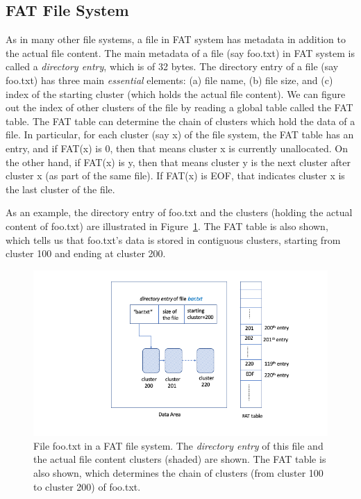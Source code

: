 \subsection{FAT File System}
\begin{paraphrase}
 As in many other file systems, a file in FAT system has metadata in addition to the actual file content. 
The main metadata of a file (say foo.txt) in FAT system is called a \emph{directory entry}, which is of 32 bytes.
The directory entry of a file (say foo.txt) has three main \emph{essential} elements: (a) file name, (b) file size, and 
(c) index of the starting cluster (which holds the actual file content). We can figure 
out the index of other clusters of the file by reading a global table called the FAT table. The FAT table
can determine the chain of clusters which hold the data of a file. In particular, 
for each cluster (say x) of the file system, the FAT table has an entry, and 
if FAT(x) is 0, then that means cluster x is currently unallocated. 
On the other hand, if FAT(x) is y, then that means cluster y is the next cluster after cluster x (as part of the same file).
If FAT(x) is EOF, that indicates cluster x is the last cluster of the file.
   
As an example, the directory entry of foo.txt and the clusters (holding the actual content of foo.txt) 
are illustrated in Figure~\ref{fig:fat1}. The FAT table is also shown, which tells us that foo.txt's data is stored 
in contiguous clusters, starting from cluster 100 and ending at cluster 200.

\begin{figure}[h]
     \centering
     \includegraphics[width=\linewidth]{fig/fat1.png}
     \caption{File foo.txt in a FAT file system. The \emph{directory entry} of this file and the actual file content clusters (shaded) are shown. 
 The FAT table is also shown, which determines the chain of clusters (from cluster 100 to cluster 200) of foo.txt.}
     \label{fig:fat1}
 \end{figure}



\end{paraphrase}
